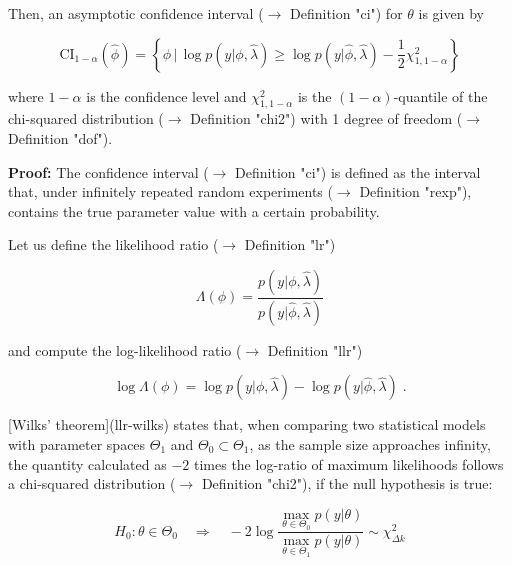 \documentclass[a4paper,12pt,twoside]{book}
\begin{document}
Then, an asymptotic confidence interval ($\rightarrow$ Definition "ci") for $\theta$ is given by

\begin{equation} \label{eq:ci-wilks-ci-wilks}
\mathrm{CI}_{1-\alpha}(\hat{\phi}) = \left\lbrace \phi \, \vert \, \log p(y|\phi,\hat{\lambda}) \geq \log p(y|\hat{\phi},\hat{\lambda}) - \frac{1}{2} \chi^2_{1,1-\alpha} \right\rbrace
\end{equation}

where $1-\alpha$ is the confidence level and $\chi^2_{1,1-\alpha}$ is the $(1-\alpha)$-quantile of the chi-squared distribution ($\rightarrow$ Definition "chi2") with 1 degree of freedom ($\rightarrow$ Definition "dof").


\vspace{1em}
\textbf{Proof:} The confidence interval ($\rightarrow$ Definition "ci") is defined as the interval that, under infinitely repeated random experiments ($\rightarrow$ Definition "rexp"), contains the true parameter value with a certain probability.

Let us define the likelihood ratio ($\rightarrow$ Definition "lr")

\begin{equation} \label{eq:ci-wilks-lr}
\Lambda(\phi) = \frac{p(y|\phi,\hat{\lambda})}{p(y|\hat{\phi},\hat{\lambda})}
\end{equation}

and compute the log-likelihood ratio ($\rightarrow$ Definition "llr")

\begin{equation} \label{eq:ci-wilks-llr}
\log \Lambda(\phi) = \log p(y|\phi,\hat{\lambda}) - \log p(y|\hat{\phi},\hat{\lambda}) \; .
\end{equation}

[Wilks' theorem](llr-wilks) states that, when comparing two statistical models with parameter spaces $\Theta_1$ and $\Theta_0 \subset \Theta_1$, as the sample size approaches infinity, the quantity calculated as $-2$ times the log-ratio of maximum likelihoods follows a chi-squared distribution ($\rightarrow$ Definition "chi2"), if the null hypothesis is true:

\begin{equation} \label{eq:ci-wilks-wilks}
H_0: \theta \in \Theta_0 \quad \Rightarrow \quad -2 \log \frac{\operatorname*{max}_{\theta \in \Theta_0} p(y|\theta)}{\operatorname*{max}_{\theta \in \Theta_1} p(y|\theta)} \sim \chi^2_{\Delta k}
\end{equation}
\end{document}
